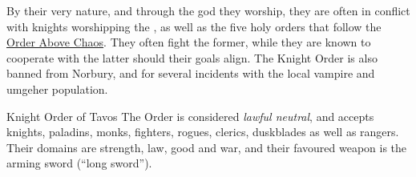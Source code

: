 By their very nature, and through the god they worship, they are often in
conflict with knights worshipping the , as well as
the five holy orders that follow the \hyperref[sec:Order]{Order Above Chaos}.
They often fight the former, while they are known to cooperate with the latter
should their goals align. The Knight Order is also banned from Norbury, and
 for several incidents with the local vampire and
umgeher population.

\begin{35e}{Knight Order of Tavos}
  The Order is considered \emph{lawful neutral}, and accepts knights, paladins,
  monks, fighters, rogues, clerics, duskblades as well as rangers. Their domains
  are strength, law, good and war, and their favoured weapon is the arming
  sword (``long sword'').
\end{35e}
